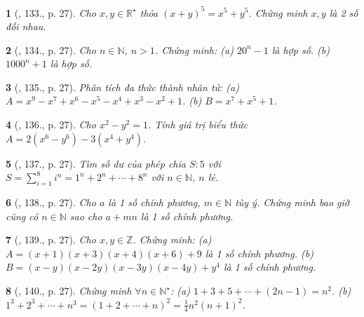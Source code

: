 \documentclass{article}
\newtheorem{baitoan}{}
\begin{document}
\begin{baitoan}[\cite{Tuyen_Toan_8}, 133., p. 27]
	Cho $x,y\in\mathbb{R}^\star$ thỏa $(x + y)^5 = x^5 + y^5$. Chứng minh $x,y$ là 2 số đối nhau.
\end{baitoan}

\begin{baitoan}[\cite{Tuyen_Toan_8}, 134., p. 27]
	Cho $n\in\mathbb{N}$, $n > 1$. Chứng minh: (a) $20^n - 1$ là hợp số. (b) $1000^n + 1$ là hợp số.
\end{baitoan}

\begin{baitoan}[\cite{Tuyen_Toan_8}, 135., p. 27]
	Phân tích đa thức thành nhân tử: (a) $A = x^9 - x^7 + x^6 - x^5 - x^4 + x^3 - x^2 + 1$. (b) $B = x^7 + x^5 + 1$.
\end{baitoan}

\begin{baitoan}[\cite{Tuyen_Toan_8}, 136., p. 27]
	Cho $x^2 - y^2 = 1$. Tính giá trị biểu thức $A = 2(x^6 - y^6) - 3(x^4 + y^4)$.
\end{baitoan}

\begin{baitoan}[\cite{Tuyen_Toan_8}, 137., p. 27]
	Tìm số dư của phép chia $S:5$ với $S = \sum_{i=1}^8 i^n = 1^n + 2^n + \cdots + 8^n$ với $n\in\mathbb{N}$, $n$ lẻ.
\end{baitoan}

\begin{baitoan}[\cite{Tuyen_Toan_8}, 138., p. 27]
	Cho $a$ là 1 số chính phương, $m\in\mathbb{N}$ tùy ý. Chứng minh bao giờ cũng có $n\in\mathbb{N}$ sao cho $a + mn$ là 1 số chính phương.
\end{baitoan}

\begin{baitoan}[\cite{Tuyen_Toan_8}, 139., p. 27]
	Cho $x,y\in\mathbb{Z}$. Chứng minh: (a) $A = (x + 1)(x + 3)(x + 4)(x + 6) + 9$ là 1 số chính phương. (b) $B = (x - y)(x - 2y)(x - 3y)(x - 4y) + y^4$ là 1 số chính phương.
\end{baitoan}

\begin{baitoan}[\cite{Tuyen_Toan_8}, 140., p. 27]
	Chứng minh $\forall n\in\mathbb{N}^\star$: (a) $1 + 3 + 5 + \cdots + (2n - 1) = n^2$. (b) $1^3 + 2^3 + \cdots + n^3 = (1 + 2 + \cdots + n)^2 = \frac{1}{4}n^2(n + 1)^2$.
\end{baitoan}


\printbibliography[heading=bibintoc]
	
\end{document}
